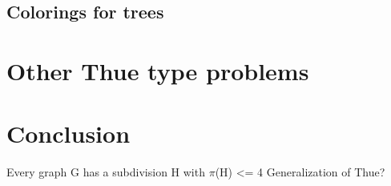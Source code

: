 \documentclass[12pt,a4paper]{article}
\begin{document}
\subsection{Colorings for trees}

\section{Other Thue type problems}

\section{Conclusion}

Every graph G has a subdivision H with $\pi$(H) <= 4 \citep{Barat2008}
Generalization of Thue?


\newpage
\printbibliography
\end{document}
